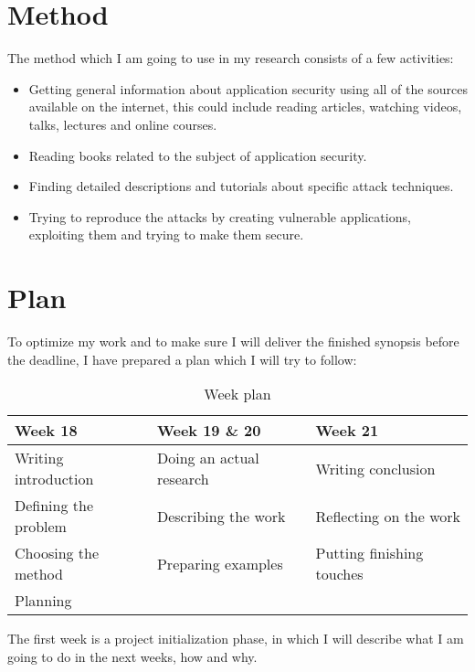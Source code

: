 \documentclass[a4paper]{article}
\begin{document}
\newpage

\section{Method}

The method which I am going to use in my research consists of a few activities:

\begin{itemize}
	\item Getting general information about application security using all
		of the sources available on the internet, this could include
		reading articles, watching videos, talks, lectures and online
		courses.
	\item Reading books related to the subject of application security.
	\item Finding detailed descriptions and tutorials about specific attack
		techniques.
	\item Trying to reproduce the attacks by creating vulnerable
		applications, exploiting them and trying to make them secure.
\end{itemize}

\section{Plan}

To optimize my work and to make sure I will deliver the finished synopsis
before the deadline, I have prepared a plan which I will try to follow:

\begin{table}[h]
	\centering
	\begin{tabular}{@{}lll@{}}
		\toprule
		Week 18              & Week 19 \& 20            & Week 21
		\\ \midrule
		Writing introduction & Doing an actual research & Writing
		conclusion        \\
		Defining the problem & Describing the work      & Reflecting on
		the work    \\
		Choosing the method  & Preparing examples       & Putting
		finishing touches \\
		Planning             &                          &
		\\ \bottomrule
	\end{tabular}
	\caption{Week plan}
	\label{my-label}
\end{table}

The first week is a project initialization phase, in which I will describe what
I am going to do in the next weeks, how and why.
\end{document}

